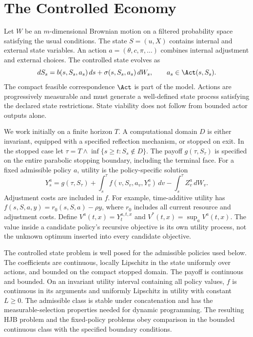 \section{The Controlled Economy}\label{sec:model}
Let $W$ be an $m$-dimensional Brownian motion on a filtered probability space satisfying the usual conditions. The state $S=(u,X)$ contains internal and external state variables. An action $a=(\theta,c,\pi,\ldots)$ combines internal adjustment and external choices. The controlled state evolves as
\begin{equation}\label{eq:state}
 dS_s=b(s,S_s,a_s)\,ds+\sigma(s,S_s,a_s)\,dW_s,
 \qquad a_s\in\Act(s,S_s).
\end{equation}
The compact feasible correspondence $\Act$ is part of the model. Actions are progressively measurable and must generate a well-defined state process satisfying the declared state restrictions. State viability does not follow from bounded actor outputs alone.

We work initially on a finite horizon $T$. A computational domain $D$ is either invariant, equipped with a specified reflection mechanism, or stopped on exit. In the stopped case let $\tau=T\wedge\inf\{s\geq t:S_s\notin D\}$. The payoff $g(\tau,S_\tau)$ is specified on the entire parabolic stopping boundary, including the terminal face. For a fixed admissible policy $a$, utility is the policy-specific solution
\begin{equation}\label{eq:bsde}
 Y_s^a=g(\tau,S_\tau)+\int_s^\tau f(v,S_v,a_v,Y_v^a)\,dv
                    -\int_s^\tau Z_v^a\,dW_v.
\end{equation}
Adjustment costs are included in $f$. For example, time-additive utility has $f(s,S,a,y)=r_0(s,S,a)-\rho y$, where $r_0$ includes all current resource and adjustment costs. Define $V^a(t,x)=Y_t^{a,t,x}$ and $V^*(t,x)=\sup_a V^a(t,x)$. The value inside a candidate policy's recursive objective is its own utility process, not the unknown optimum inserted into every candidate objective.

\begin{assumption}\label{ass:model}
The controlled state problem is well posed for the admissible policies used below. The coefficients are continuous, locally Lipschitz in the state uniformly over actions, and bounded on the compact stopped domain. The payoff is continuous and bounded. On an invariant utility interval containing all policy values, $f$ is continuous in its arguments and uniformly Lipschitz in utility with constant $L\geq0$. The admissible class is stable under concatenation and has the measurable-selection properties needed for dynamic programming. The resulting HJB problem and the fixed-policy problems obey comparison in the bounded continuous class with the specified boundary conditions.
\end{assumption}

